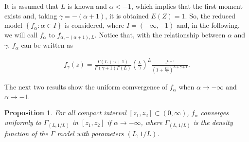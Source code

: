 \documentclass[technote,onecolumn,draftcls,12pt]{IEEEtran}
\newtheorem{proposition}{Proposition}
\numberwithin{equation}{section}
\newcommand{\pa}[1]{\ensuremath{\left( #1 \right)}}
\newcommand{\set}[1]{\ensuremath{\left\{ #1 \right\}}}
\begin{document}
It is assumed that  $L$ is known and $\alpha<-1$, which implies that the first moment exists and, 
taking $\gamma = -\pa{\alpha+1}$, it is obtained $E(Z) = 1$.
So, the reduced model $\set{f_{\alpha}:\alpha\in I}$ is considered,
where $I = \pa{-\infty,-1}\label{I}$ and, in the following, we will call $f_{\alpha}$ to $f_{\alpha,-\pa{\alpha+1},L}$.
Notice that, with the relationship between $\alpha$ and $\gamma$, $f_{\alpha}$ can be written as

\begin{align}
f_{\gamma}(z)=\frac{\Gamma\pa{L+\gamma+1}}{\Gamma\pa{\gamma+1}\Gamma\pa{L}}
\pa{\frac{L}{\gamma}}^L \frac{z^{L-1}}{\pa{1+\frac{Lz}{\gamma}}^{L+\gamma+1}}.
\label{fgamma}
\end{align}




The next two results show the uniform comvergence of $f_\alpha$ when $\alpha \to -\infty$ and $\alpha \to -1$.



\begin{proposition}
	For all compact interval $[z_{1},z_{2}]\subset\pa{0,\infty}$, $f_{\alpha}$ converges uniformly to $\Gamma_{(L,1/L)}$ in $[z_{1},z_{2}]$ if $\alpha\to -\infty$,
	where $\Gamma_{(L,1/L)}$ is the density function of the $\Gamma$ model with parameters $\pa{L,1/L}$.
	\label{pr: convergenciauniforme1}
\end{proposition}
\end{document}
